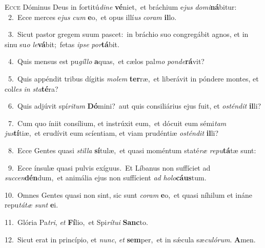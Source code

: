 \lettrine{\initial\textcolor{\initialcolor}{E}}{cce} Dóminus Deus in fortitú\-\textit{di}\-\textit{ne} \textbf{vé}\-niet,~\star et bráchium e\textit{jus} \textit{do}\-\textit{mi}\textbf{ná}bitur:\\
{\numbfont\textcolor{\numbcolor}{~2.}}~Ecce merces e\textit{jus} \textit{cum} \textbf{e}\-o,~\star et opus illí\textit{us} \textit{co}\-\textit{ram} \textbf{il}\-lo.\par
{\numbfont\textcolor{\numbcolor}{~3.}}~Sicut pastor gregem suum pascet:~\dagger in bráchio suo congregábit agnos, et in sinu su\textit{o} \textit{le}\-\textbf{vá}bit;~\star fetas \textit{ip}\-\textit{se} \textit{por}\-\textbf{tá}bit.\par
{\numbfont\textcolor{\numbcolor}{~4.}}~Quis mensus est pu\-\textit{gíl}\-\textit{lo} \textbf{a}\-quas,~\star et cælos pal\textit{mo} \textit{pon}\-\textit{de}\textbf{rá}vit?\par
{\numbfont\textcolor{\numbcolor}{~5.}}~Quis appéndit tribus dígitis \textit{mo}\-\textit{lem} \textbf{ter}\-ræ,~\star et liberávit in póndere montes, et col\textit{les} \textit{in} \textit{sta}\-\textbf{té}ra?\par
{\numbfont\textcolor{\numbcolor}{~6.}}~Quis adjúvit spí\-\textit{ri}\-\textit{tum} \textbf{Dó}\-mini?~\star aut quis consiliárius ejus fuit, et \textit{os}\-\textit{tén}\textit{dit} \textbf{il}\-li?\par
{\numbfont\textcolor{\numbcolor}{~7.}}~Cum quo íniit consílium, et instrúxit eum,~\dagger et dócuit eum sémi\textit{tam} \textit{jus}\-\textbf{tí}tiæ,~\star et erudívit eum scíentiam, et viam prudéntiæ \textit{os}\-\textit{tén}\textit{dit} \textbf{il}\-li?\par
{\numbfont\textcolor{\numbcolor}{~8.}}~Ecce Gentes quasi \textit{stil}\-\textit{la} \textbf{sí}\-tulæ,~\star et quasi moméntum staté\textit{ræ} \textit{re}\-\textit{pu}\textbf{tá}tæ sunt:\par
{\numbfont\textcolor{\numbcolor}{~9.}}~Ecce ínsulæ quasi pulvis exíguus.~\dagger Et Líbanus non suffíciet ad \textit{suc}\-\textit{cen}\textbf{dén}dum,~\star et animália ejus non suffícient \textit{ad} \textit{ho}\-\textit{lo}\textbf{cáus}tum.\par
{\numbfont\textcolor{\numbcolor}{10.}}~Omnes Gentes quasi non sint, sic sunt \textit{co}\-\textit{ram} \textbf{e}\-o,~\star et quasi níhilum et ináne repu\-\textit{tá}\-\textit{tæ} \textit{sunt} \textbf{e}\-i.\par
{\numbfont\textcolor{\numbcolor}{11.}}~Glória Pa\-\textit{tri}\-, \textit{et} \textbf{Fí}\-lio,~\star et Spi\-\textit{rí}\-\textit{tu}\textit{i} \textbf{Sanc}\-to.\par
{\numbfont\textcolor{\numbcolor}{12.}}~Sicut erat in princípio, et \textit{nunc}\-, \textit{et} \textbf{sem}\-per,~\star et in sǽcula sæ\-\textit{cu}\-\textit{ló}\textit{rum}. \textbf{A}\-men.\par
